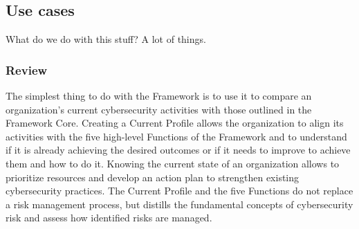 \subsection{Use cases}
What do we do with this stuff? A lot of things.
\subsubsection{Review}
The simplest thing to do with the Framework is to use it to compare an organization's current cybersecurity activities with those outlined in the Framework Core. Creating a Current Profile allows the organization to align its activities with the five high-level Functions of the Framework and to understand if it is already achieving the desired outcomes or if it needs to improve to achieve them and how to do it. Knowing the current state of an organization allows to prioritize resources and develop an action plan to strengthen existing cybersecurity practices. The Current Profile and the five Functions do not replace a risk management process, but distills the fundamental concepts of cybersecurity risk and assess how identified risks are managed.
